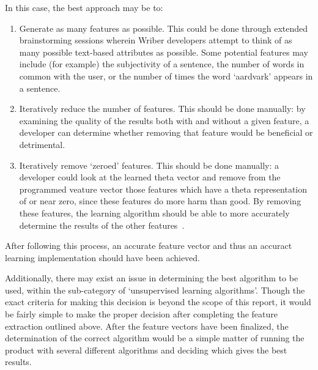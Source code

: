 \documentclass[12pt]{article}
\begin{document}
In this case, the best approach may be to:
\begin{enumerate}
\item Generate as many features as possible. This could be done through extended brainstorming sessions wherein Wriber developers attempt to think of as many possible text-based attributes as possible. Some potential features may include (for example) the subjectivity of a sentence, the number of words in common with the user, or the number of times the word `aardvark' appears in a sentence.
\item Iteratively reduce the number of features. This should be done manually: by examining the quality of the results both with and without a given feature, a developer can determine whether removing that feature would be beneficial or detrimental.
\item Iteratively remove `zeroed' features. This should be done manually: a developer could look at the learned theta vector and remove from the programmed veature vector those features which have a theta representation of or near zero, since these features do more harm than good. By removing these features, the learning algorithm should be able to more accurately determine the results of the other features~\cite{dimen}.
\end{enumerate}

After following this process, an accurate feature vector and thus an accuract learning implementation should have been achieved.

Additionally, there may exist an issue in determining the best algorithm to be used, within the sub-category of `unsupervised learning algorithms'. Though the exact criteria for making this decision is beyond the scope of this report, it would be fairly simple to make the proper decision after completing the feature extraction outlined above. After the feature vectors have been finalized, the determination of the correct algorithm would be a simple matter of running the product with several different algorithms and deciding which gives the best results.
\newpage



\newpage
\end{document}
